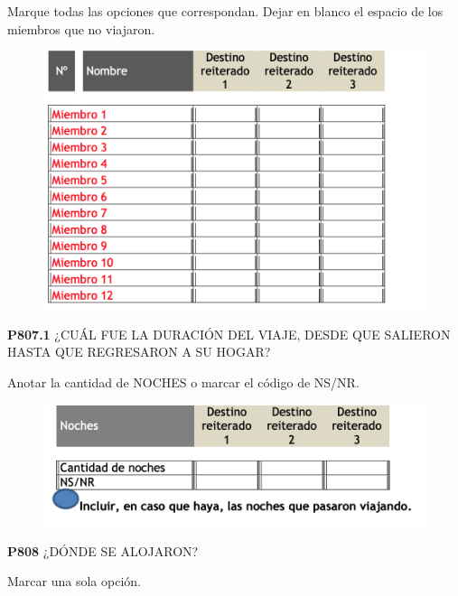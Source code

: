 \documentclass[
  openany]{book}
\begin{document}
Marque todas las opciones que correspondan. Dejar en blanco el espacio de los miembros que no viajaron.

\begin{figure}

{\centering \includegraphics[width=1\linewidth]{imagenes/figura6-260} 

}

\end{figure}

\textbf{P807.1} ¿CUÁL FUE LA DURACIÓN DEL VIAJE, DESDE QUE SALIERON HASTA QUE REGRESARON A SU HOGAR?

Anotar la cantidad de NOCHES o marcar el código de NS/NR.

\begin{figure}

{\centering \includegraphics[width=1\linewidth]{imagenes/figura6-261} 

}

\end{figure}

\textbf{P808} ¿DÓNDE SE ALOJARON?

Marcar una sola opción.
\end{document}
